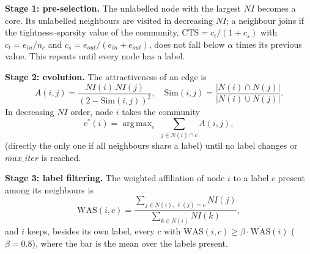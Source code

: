 \documentclass[conference]{IEEEtran}
\DeclareMathOperator*{\argmax}{arg\,max}
\begin{document}
\textbf{Stage 1: pre-selection.} The unlabelled node with the largest $NI$ becomes a core. Its unlabelled neighbours are visited in decreasing $NI$; a neighbour joins if the tightness--sparsity value of the community, $\mathrm{CTS}=c_t/(1+c_s)$ with $c_t=e_{in}/n_c$ and $c_s=e_{out}/(e_{in}+e_{out})$, does not fall below $\alpha$ times its previous value. This repeats until every node has a label.

\textbf{Stage 2: evolution.} The attractiveness of an edge is
\begin{equation}
A(i,j)=\frac{NI(i)\,NI(j)}{(2-\mathrm{Sim}(i,j))^2},\quad \mathrm{Sim}(i,j)=\frac{|N(i)\cap N(j)|}{|N(i)\cup N(j)|}.\label{eq:A}
\end{equation}
In decreasing $NI$ order, node $i$ takes the community
\begin{equation}
c^{*}(i)=\argmax_{c}\;\sum_{j\in N(i)\cap c}A(i,j),\label{eq:stage2}
\end{equation}
(directly the only one if all neighbours share a label) until no label changes or $max\_iter$ is reached.

\textbf{Stage 3: label filtering.} The weighted affiliation of node $i$ to a label $c$ present among its neighbours is
\begin{equation}
\mathrm{WAS}(i,c)=\frac{\sum_{j\in N(i),\,\ell(j)=c}NI(j)}{\sum_{k\in N(i)}NI(k)},\label{eq:was}
\end{equation}
and $i$ keeps, besides its own label, every $c$ with $\mathrm{WAS}(i,c)\ge\beta\cdot\overline{\mathrm{WAS}}(i)$ ($\beta=0.8$), where the bar is the mean over the labels present.
\end{document}
